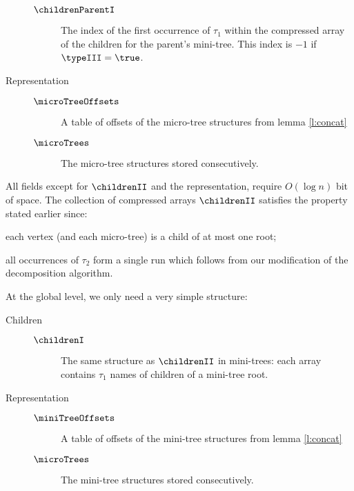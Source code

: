 \begin{description}
\begin{description}
		\item[$\childrenParentI$]
		The index of the first occurrence of $\tau_1$ within the compressed array of the children for the parent's mini-tree.
		This index is $-1$ if $\typeIII = \true$.
	\end{description}
	
	\item[Representation]
	\begin{description}
		\item[]
	
		\item[$\microTreeOffsets$]
		A table of offsets of the micro-tree structures from lemma \ref{l:concat}
		
		\item[$\microTrees$]
		The micro-tree structures stored consecutively.
	\end{description}
\end{description}

All fields except for $\childrenII$ and the representation, require $O(\log n)$ bit of space.
The collection of compressed arrays $\childrenII$ satisfies the property stated earlier since:
\begin{enuminline}
	\item each vertex (and each micro-tree) is a child of at most one root;
	\item all occurrences of $\tau_2$ form a single run which follows from our modification of the decomposition algorithm.
\end{enuminline}

\bigbreak

At the global level, we only need a very simple structure:
\begin{description}
	\item[Children]
	\begin{description}
		\item[]
		\item[$\childrenI$]
		The same structure as $\childrenII$ in mini-trees: each array contains $\tau_1$ names of children of a mini-tree root.
	\end{description}

	\item[Representation]
	\begin{description}
		\item[]
	
		\item[$\miniTreeOffsets$]
		A table of offsets of the mini-tree structures from lemma \ref{l:concat}
		
		\item[$\microTrees$]
		The mini-tree structures stored consecutively.
	\end{description}
\end{description}

